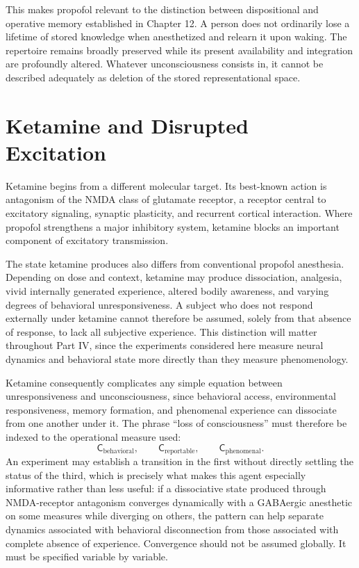 \documentclass[11pt]{book}
\begin{document}
This makes propofol relevant to the distinction between dispositional and operative memory established in Chapter 12. A person does not ordinarily lose a lifetime of stored knowledge when anesthetized and relearn it upon waking. The repertoire remains broadly preserved while its present availability and integration are profoundly altered. Whatever unconsciousness consists in, it cannot be described adequately as deletion of the stored representational space.

\section*{Ketamine and Disrupted Excitation}

Ketamine begins from a different molecular target. Its best-known action is antagonism of the NMDA class of glutamate receptor, a receptor central to excitatory signaling, synaptic plasticity, and recurrent cortical interaction. Where propofol strengthens a major inhibitory system, ketamine blocks an important component of excitatory transmission.

The state ketamine produces also differs from conventional propofol anesthesia. Depending on dose and context, ketamine may produce dissociation, analgesia, vivid internally generated experience, altered bodily awareness, and varying degrees of behavioral unresponsiveness. A subject who does not respond externally under ketamine cannot therefore be assumed, solely from that absence of response, to lack all subjective experience. This distinction will matter throughout Part IV, since the experiments considered here measure neural dynamics and behavioral state more directly than they measure phenomenology.

Ketamine consequently complicates any simple equation between unresponsiveness and unconsciousness, since behavioral access, environmental responsiveness, memory formation, and phenomenal experience can dissociate from one another under it. The phrase ``loss of consciousness'' must therefore be indexed to the operational measure used:
\[
\mathsf C_{\mathrm{behavioral}},
\qquad
\mathsf C_{\mathrm{reportable}},
\qquad
\mathsf C_{\mathrm{phenomenal}}.
\]
An experiment may establish a transition in the first without directly settling the status of the third, which is precisely what makes this agent especially informative rather than less useful: if a dissociative state produced through NMDA-receptor antagonism converges dynamically with a GABAergic anesthetic on some measures while diverging on others, the pattern can help separate dynamics associated with behavioral disconnection from those associated with complete absence of experience. Convergence should not be assumed globally. It must be specified variable by variable.
\end{document}
